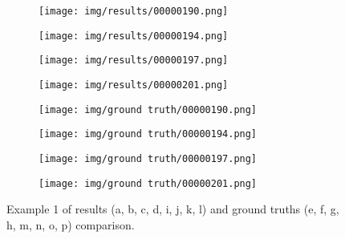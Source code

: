 \documentclass[conference]{IEEEtran}
\begin{document}
\begin{figure*}[htbp]
        \begin{subfigure}[b]{0.22\linewidth}
            \centering
            \texttt{[image: img/results/00000190.png]}
            \caption{}
            \label{res:1:190}
        \end{subfigure}
        \hfill
        \begin{subfigure}[b]{0.22\linewidth}
            \centering
            \texttt{[image: img/results/00000194.png]}
            \caption{}
            \label{res:1:194}
        \end{subfigure}
        \hfill
        \begin{subfigure}[b]{0.22\linewidth}
            \centering
            \texttt{[image: img/results/00000197.png]}
            \caption{}
            \label{res:1:197}
        \end{subfigure}
        \hfill
        \begin{subfigure}[b]{0.22\linewidth}
            \centering
            \texttt{[image: img/results/00000201.png]}
            \caption{}
            \label{res:1:201}
        \end{subfigure}

        \begin{subfigure}[b]{0.22\linewidth}
            \centering
            \texttt{[image: img/ground truth/00000190.png]}
            \caption{}
            \label{res:1:190:gt}
        \end{subfigure}
        \hfill
        \begin{subfigure}[b]{0.22\linewidth}
            \centering
            \texttt{[image: img/ground truth/00000194.png]}
            \caption{}
            \label{res:1:194:gt}
        \end{subfigure}
        \hfill
        \begin{subfigure}[b]{0.22\linewidth}
            \centering
            \texttt{[image: img/ground truth/00000197.png]}
            \caption{}
            \label{res:1:197:gt}
        \end{subfigure}
        \hfill
        \begin{subfigure}[b]{0.22\linewidth}
            \centering
            \texttt{[image: img/ground truth/00000201.png]}
            \caption{}
            \label{res:1:201:gt}
        \end{subfigure}

        \caption{Example 1 of results (a, b, c, d, i, j, k, l) and ground truths (e, f, g, h, m, n, o, p) comparison.}
        \label{res:1}
    \end{figure*}
\end{document}
